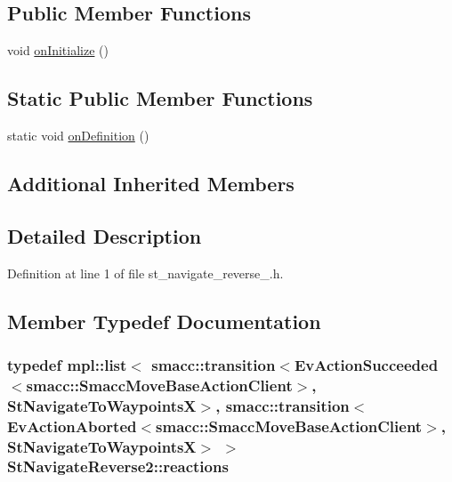 \subsection*{Public Member Functions}
\begin{DoxyCompactItemize}
\item 
void \hyperlink{structStNavigateReverse2_ac5c81b2766cc7716242d6f71c8b0ea8c}{on\+Initialize} ()
\end{DoxyCompactItemize}
\subsection*{Static Public Member Functions}
\begin{DoxyCompactItemize}
\item 
static void \hyperlink{structStNavigateReverse2_a4d67cfa966a4e4bbb6dedc75007de180}{on\+Definition} ()
\end{DoxyCompactItemize}
\subsection*{Additional Inherited Members}


\subsection{Detailed Description}


Definition at line 1 of file st\+\_\+navigate\+\_\+reverse\+\_.\+h.



\subsection{Member Typedef Documentation}
\subsubsection[{\texorpdfstring{reactions}{reactions}}]{\setlength{\rightskip}{0pt plus 5cm}typedef mpl\+::list$<$ {\bf smacc\+::transition}$<$Ev\+Action\+Succeeded$<${\bf smacc\+::\+Smacc\+Move\+Base\+Action\+Client}$>$, {\bf St\+Navigate\+To\+WaypointsX}$>$, {\bf smacc\+::transition}$<$Ev\+Action\+Aborted$<${\bf smacc\+::\+Smacc\+Move\+Base\+Action\+Client}$>$, {\bf St\+Navigate\+To\+WaypointsX}$>$ $>$ {\bf St\+Navigate\+Reverse2\+::reactions}}\hypertarget{structStNavigateReverse2_af0a697d39c2eef15955e3a2653009b3b}{}\label{structStNavigateReverse2_af0a697d39c2eef15955e3a2653009b3b}


